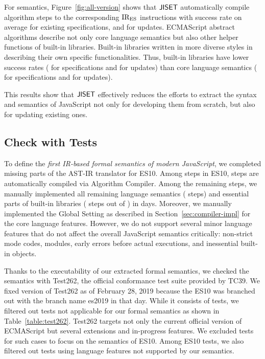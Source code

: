 For semantics, Figure~\ref{fig:all-version} shows that \( \text{\sf JISET} \) automatically
compile algorithm steps to the corresponding \( \text{IR}_\text{ES} \) instructions with
 success rate on average for existing specifications, and
 for updates.  ECMAScript abstract algorithms describe not only
core language semantics but also other helper functions of built-in libraries.
Built-in libraries written in more diverse styles in describing their own
specific functionalities.  Thus, built-in libraries have lower success rates
( for specifications and  for updates) than core
language semantics ( for specifications and  for
updates).

This results show that \( \text{\sf JISET} \) effectively reduces the efforts to
extract the syntax and semantics of JavaScript not only for developing
them from scratch, but also for updating existing ones.


\subsection{Check with Tests}\label{sec:check-with-tests}

To define the \textit{first IR-based formal semantics of modern JavaScript}, we
completed missing parts of the AST-IR translator for ES10.  Among 
steps in ES10,  steps are automatically compiled via
\textsf{Algorithm Compiler}.  Among the remaining  steps, we manually
implemented all remaining language semantics ( steps) and essential
parts of built-in libraries ( steps out of ) in 
days.  Moreover, we manually implemented the \textsf{Global Setting} as described
in Section~\ref{sec:compiler-impl} for the core language features.  However, we
do not support several minor language features that do not affect the overall
JavaScript semantics critically: non-strict mode codes, modules, early errors
before actual executions, and inessential built-in objects.

Thanks to the executability of our extracted formal semantics, we checked the
semantics with Test262, the official conformance test suite provided by TC39.
We fixed version of Test262 as of February 28, 2019 because the ES10 was
branched out with the branch name es2019 in that day.  While it consists of
 tests, we filtered out  tests not applicable for
our formal semantics as shown in Table~\ref{table:test262}.  Test262 targets not
only the current official version of ECMAScript but several extensions and
in-progress features. We excluded  tests for such cases to focus on
the semantics of ES10.  Among  ES10 tests, we also filtered out
 tests using language features not supported by our semantics.

